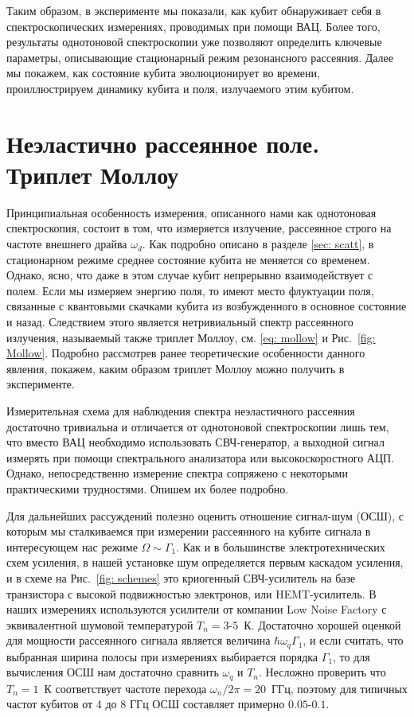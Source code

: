Таким образом, в эксперименте мы показали, как кубит обнаруживает себя в спектроскопических измерениях, проводимых при помощи ВАЦ. Более того, результаты однотоновой спектроскопии уже позволяют определить ключевые параметры, описывающие стационарный режим резонансного рассеяния. Далее мы покажем, как состояние кубита эволюционирует во времени, проиллюстрируем динамику кубита и поля, излучаемого этим кубитом. 
\section{Неэластично рассеянное поле. Триплет Моллоу}
Принципиальная особенность измерения, описанного нами как однотоновая спектроскопия, состоит в том, что измеряется излучение, рассеянное строго на частоте внешнего драйва $\omega_d$. Как подробно описано в разделе \ref{sec: scatt}, в стационарном режиме среднее состояние кубита не меняется со временем. Однако, ясно, что даже в этом случае кубит непрерывно взаимодействует с полем. Если мы измеряем энергию поля, то имеют место флуктуации поля, связанные с квантовыми скачками кубита из возбужденного в основное состояние и назад. Следствием этого является нетривиальный спектр рассеянного излучения, называемый также триплет Моллоу, см. \eqref{eq: mollow} и Рис.~\ref{fig: Mollow}. Подробно рассмотрев ранее теоретические особенности данного явления, покажем, каким образом триплет Моллоу можно получить в эксперименте.

Измерительная схема для наблюдения спектра неэластичного рассеяния достаточно тривиальна и отличается от однотоновой спектроскопии лишь тем, что вместо ВАЦ необходимо использовать СВЧ-генератор, а выходной сигнал измерять при помощи спектрального анализатора или высокоскоростного АЦП. Однако, непосредственно измерение спектра сопряжено с некоторыми практическими трудностями. Опишем их более подробно.

Для дальнейших рассуждений полезно оценить отношение сигнал-шум (ОСШ), с которым мы сталкиваемся при измерении рассеянного на кубите сигнала в интересующем нас режиме $\Omega \sim \Gamma_1$. Как и в большинстве электротехнических схем усиления, в нашей установке шум определяется первым каскадом усиления, и в схеме на Рис.~\ref{fig: schemes} это криогенный СВЧ-усилитель на базе транзистора с высокой подвижностью электронов, или HEMT-усилитель. В наших измерениях используются усилители от компании Low Noise Factory с эквивалентной шумовой температурой $T_n=3\text{-}5$~К. Достаточно хорошей оценкой для мощности рассеянного сигнала является величина $\hbar \omega_q\Gamma_1$, и если считать, что выбранная ширина полосы при измерениях выбирается порядка $\Gamma_1$, то для вычисления ОСШ нам достаточно сравнить $\omega_q$ и $T_n$. Несложно проверить что $T_n=1$~К соответствует частоте перехода $\omega_n/2\pi=20$~ГГц, поэтому для типичных частот кубитов от 4 до 8 ГГц ОСШ составляет примерно $0.05\text{-}0.1$. 

